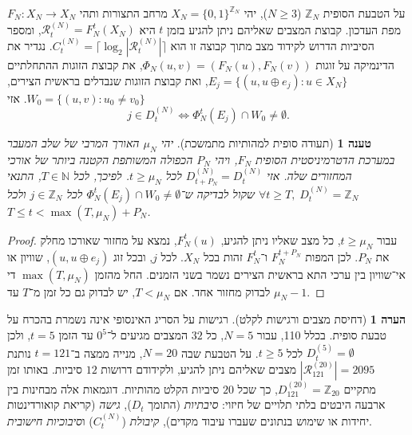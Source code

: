 \documentclass[11pt,a4paper]{article}
\newtheorem{proposition}[theorem]{טענה}
\theoremstyle{definition}
\newtheorem{remark}[theorem]{הערה}
\begin{document}
על הטבעת הסופית $\mathbb{Z}_N$ ($N \ge 3$), יהי $X_N = \{0, 1\}^{\mathbb{Z}_N}$ מרחב התצורות ותהי $F_N : X_N \to X_N$ מפת העדכון. קבוצת המצבים שאליהם ניתן להגיע בזמן $t$ היא $\mathcal{R}_t^{(N)} = F_N^t(X_N)$, ומספר הסיביות הדרוש לקידוד מצב מתוך קבוצה זו הוא $C_t^{(N)} = \lceil \log_2 |\mathcal{R}_t^{(N)}| \rceil$. נגדיר את הדינמיקה על זוגות $\Phi_N(u, v) = (F_N(u), F_N(v))$, את קבוצת הזוגות ההתחלתיים $E_j = \{ (u, u \oplus e_j) : u \in X_N \}$, ואת קבוצת הזוגות שנבדלים בראשית הצירים, $W_0 = \{ (u,v) : u_0 \ne v_0 \}$. אזי
\begin{equation}
j \in D_t^{(N)} \iff \Phi_N^t(E_j) \cap W_0 \ne \emptyset.
\end{equation}

\begin{proposition}[תעודה סופית למהותיות מתמשכת]\label{prop:ring_cert}
יהי $\mu_N$ האורך המרבי של שלב המעבר במערכת הדטרמיניסטית הסופית $F_N$, ויהי $P_N$ הכפולה המשותפת הקטנה ביותר של אורכי המחזורים שלה. אזי $D_{t+P_N}^{(N)} = D_t^{(N)}$ לכל $t \ge \mu_N$. לפיכך, לכל $T \in \mathbb{N}$, התנאי $\forall t \ge T,\; D_t^{(N)} = \mathbb{Z}_N$ שקול לבדיקה ש־$\Phi_N^t(E_j) \cap W_0 \ne \emptyset$ לכל $j \in \mathbb{Z}_N$ ולכל $T \le t < \max(T, \mu_N) + P_N$.
\end{proposition}

\begin{proof}
עבור $t\ge\mu_N$, כל מצב שאליו ניתן להגיע, $F_N^t(u)$, נמצא על מחזור שאורכו מחלק את $P_N$. לכן המפות $F_N^{t+P_N}$ ו־$F_N^t$ זהות בכל $X_N$. לכל $j$, ובכל זוג $(u,u\oplus e_j)$, שוויון או אי־שוויון בין ערכי התא בראשית הצירים נשמר בשני הזמנים. החל מהזמן $\max(T,\mu_N)$ די לבדוק מחזור אחד. אם $T<\mu_N$, יש לבדוק גם כל זמן מ־$T$ עד $\mu_N-1$.
\end{proof}

\begin{remark}[דחיסת מצבים ורגישות לקלט]\label{rem:ring5}
רגישות על הסריג האינסופי אינה נשמרת בהכרח על טבעת סופית. בכלל 110, עבור $N = 5$, כל $32$ המצבים מגיעים ל־$0^5$ עד הזמן $t = 5$, ולכן $D_t^{(5)} = \emptyset$ לכל $t \ge 5$. על הטבעת שבה $N = 20$, מנייה ממצה ב־$t = 121$ נותנת $|\mathcal{R}_{121}^{(20)}| = 2095$ מצבים שאליהם ניתן להגיע, ולקידודם דרושות $12$ סיביות. באותו זמן מתקיים $D_{121}^{(20)} = \mathbb{Z}_{20}$, כך שכל $20$ סיביות הקלט מהותיות. דוגמאות אלה מבחינות בין ארבעה היבטים בלתי תלויים של חיזוי: \emph{סיבתיות} (התומך $D_t$), \emph{גישה} (קריאת קואורדינטות יחידות או שימוש בנתונים שעברו עיבוד מקדים), \emph{קיבולת} ($C_t^{(N)}$) ו\emph{סיבוכיות חישובית}.
\end{remark}
\end{document}
